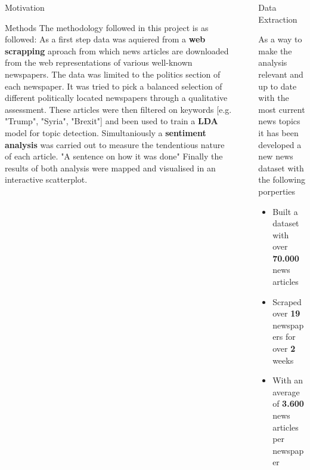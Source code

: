 \documentclass[final]{beamer}
\newlength{\sepwid}
\newlength{\onecolwid}
\begin{document}
\begin{frame}[t]
\begin{columns}[t]
\begin{column}{\onecolwid}
\begin{block}{Motivation {}}
\end{block}


\begin{block}{Methods}
    The methodology followed in this project is as followed: As a first step data was aquiered from a \textbf{web scrapping} aproach from which news articles are downloaded from the web representations of various well-known newspapers. The data was limited to the politics section of each newspaper. It was tried to pick a balanced selection of different politically located newspapers through a qualitative assessment.
    These articles were then filtered on keywords [e.g. "Trump", "Syria", "Brexit"] and been used to train a \textbf{LDA} model for topic detection. Simultaniously a \textbf{sentiment analysis} was carried out to measure the tendentious nature of each article. "A sentence on how it was done"
    Finally the results of both analysis were mapped and visualised in an interactive scatterplot. 
\end{block}
    

\end{column} %

\begin{column}{\sepwid}\end{column} %

\begin{column}{\onecolwid} %



\begin{block}{Data Extraction}

    As a way to make the analysis relevant and up to date with the most current news topics
    it has been developed a new news dataset with the following porperties

    \begin{itemize}
        \item Built a dataset with over \textbf{70.000} news articles
        \item Scraped over \textbf{19} newspapers for over \textbf{2} weeks
        \item With an average of \textbf{3.600} news articles per newspaper
    \end{itemize}


\end{block}
\end{column}
\end{columns}
\end{frame}
\end{document}
